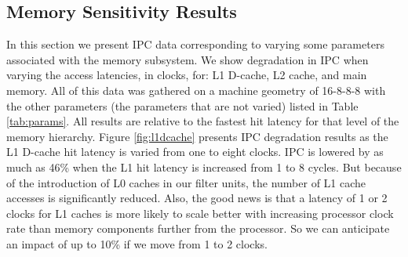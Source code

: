 \documentclass[10pt,twocolumn,dvips]{article}
\begin{document}
\subsection{Memory Sensitivity Results}
%
In this section we present IPC data corresponding to varying some
parameters associated with the memory subsystem.
We show degradation in IPC  
when varying the access latencies,
in clocks, for: 
L1 D-cache,
L2 cache, and
main memory.
All of this data was gathered on a machine geometry 
of 16-8-8-8 with the other parameters (the parameters that are
not varied) listed in Table \ref{tab:params}.
All results are relative to the fastest hit latency for that
level of the memory hierarchy.  
Figure \ref{fig:l1dcache} presents IPC degradation results
as the L1 D-cache hit latency is varied from one to eight clocks.
IPC is lowered by as much as 46\% when the L1 hit latency is 
increased from 1 to 8 cycles.
But because of the introduction of L0 caches in our
filter units, the number of L1 cache accesses is significantly
reduced.
Also, the good news is that a latency of 1 or 2 clocks
for L1 caches is more likely to scale better with increasing
processor clock rate than memory components further from the processor.
So we can anticipate an impact of up to 10\% if we move from 1 to 
2 clocks.
\end{document}
